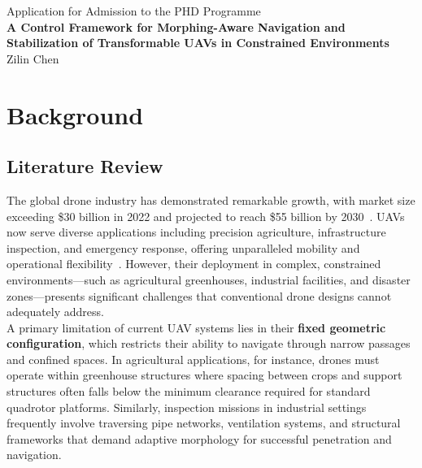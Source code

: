 \documentclass[11pt,a4paper]{article}
\begin{document}
\begin{center}
    \normalsize{Application for Admission to the PHD Programme}\\
    \textbf{\Large{A Control Framework for Morphing-Aware Navigation and Stabilization of Transformable UAVs in Constrained Environments}}\\
    \normalsize{Zilin Chen}
\end{center}

\section{Background}
\subsection{Literature Review}
The global drone industry has demonstrated remarkable growth, with market size exceeding \$30 billion in 2022 and projected to reach \$55 billion by 2030~\cite{nonami2025overview}. UAVs now serve diverse applications including precision agriculture, infrastructure inspection, and emergency response, offering unparalleled mobility and operational flexibility~\cite{COLOMINA201479}. However, their deployment in complex, constrained environments—such as agricultural greenhouses, industrial facilities, and disaster zones—presents significant challenges that conventional drone designs cannot adequately address.\\
A primary limitation of current UAV systems lies in their \textbf{fixed geometric configuration}, which restricts their ability to navigate through narrow passages and confined spaces. In agricultural applications, for instance, drones must operate within greenhouse structures where spacing between crops and support structures often falls below the minimum clearance required for standard quadrotor platforms. Similarly, inspection missions in industrial settings frequently involve traversing pipe networks, ventilation systems, and structural frameworks that demand adaptive morphology for successful penetration and navigation.\\
\end{document}
